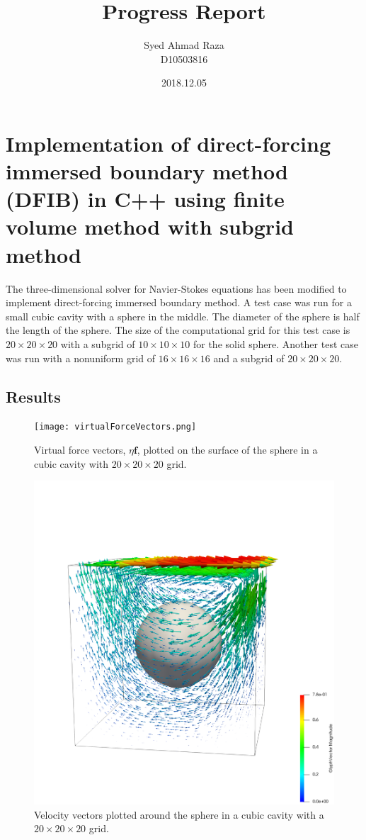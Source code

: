\documentclass[12pt,a4paper,fleqn]{article}
\title{Progress Report}
\author{Syed Ahmad Raza\\
        D10503816}
\date{2018.12.05}
\begin{document}
\maketitle

\section{Implementation of direct-forcing immersed boundary method (DFIB) in C++ using finite volume method with subgrid method}

The three-dimensional solver for Navier-Stokes equations has been modified to implement direct-forcing immersed boundary method. A test case was run for a small cubic cavity with a sphere in the middle. The diameter of the sphere is half the length of the sphere. The size of the computational grid for this test case is \(20 \times 20 \times 20\) with a subgrid of \(10 \times 10 \times 10\) for the solid sphere. Another test case was run with a nonuniform grid of \(16 \times 16 \times 16\) and a subgrid of \(20 \times 20 \times 20\).

\subsection{Results}

\begin{figure}[H]
    \centering
    \texttt{[image: virtualForceVectors.png]}
    \caption{Virtual force vectors, \(\eta \boldsymbol{f}\), plotted on the surface of the sphere in a cubic cavity with \(20 \times 20 \times 20\) grid.}
\end{figure}

\begin{figure}[H]
    \centering
    \includegraphics[width=\linewidth]{velocityVectors.png}
    \caption{Velocity vectors plotted around the sphere in a cubic cavity with a \(20 \times 20 \times 20\) grid.}
\end{figure}
\end{document}
